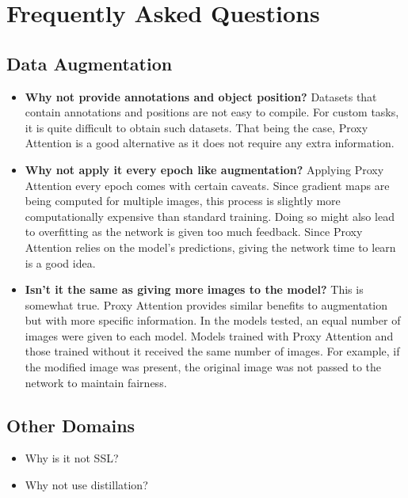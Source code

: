 \chapter{Frequently Asked Questions} \label{ch:faq}

\section{Data Augmentation}
\begin{itemize}
    \item \textbf{Why not provide annotations and object position? }Datasets that contain annotations and positions are not easy to compile. For custom tasks, it is quite difficult to obtain such datasets. That being the case, Proxy Attention is a good alternative as it does not require any extra information.

    \item \textbf{Why not apply it every epoch like augmentation? } Applying Proxy Attention every epoch comes with certain caveats. Since gradient maps are being computed for multiple images, this process is slightly more computationally expensive than standard training. Doing so might also lead to overfitting as the network is given too much feedback. Since Proxy Attention relies on the model's predictions, giving the network time to learn is a good idea.

    \item \textbf{Isn't it the same as giving more images to the model? } This is somewhat true. Proxy Attention provides similar benefits to augmentation but with more specific information. In the models tested, an equal number of images were given to each model. Models trained with Proxy Attention and those trained without it received the same number of images. For example, if the modified image was present, the original image was not passed to the network to maintain fairness.
\end{itemize}

\section{Other Domains}
\begin{itemize}
\item Why is it not SSL?
\item Why not use distillation?
\end{itemize}

